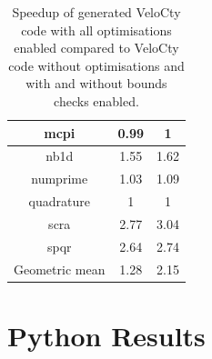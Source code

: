 \begin{table}[htbp]
\begin{tabular}{|c|c|c|}
mcpi                        & 0.99& 1                                                                           \\ \hline
nb1d                        & 1.55& 1.62\\ \hline
numprime                    & 1.03& 1.09\\ \hline
quadrature                  & 1                                                                              & 1                                                                           \\ \hline
scra                        & 2.77& 3.04\\ \hline
spqr                        & 2.64& 2.74\\ \hline
Geometric mean              & 1.28& 2.15\\ \hline
\end{tabular}
\caption{Speedup of generated VeloCty code with all optimisations enabled compared to VeloCty code without optimisations and with and without bounds checks enabled.}
\label{tab:covscwcwo}
\end{table}
\section{Python Results}
